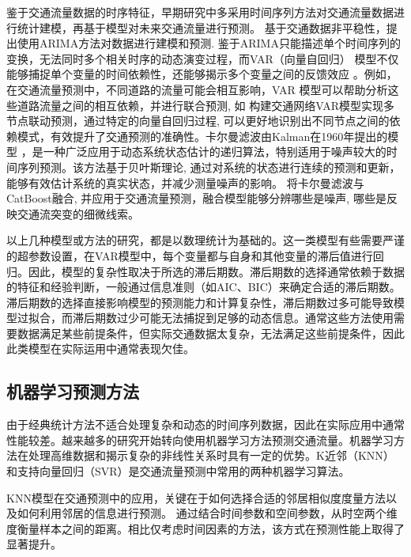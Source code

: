 鉴于交通流量数据的时序特征，早期研究中多采用时间序列方法对交通流量数据进行统计建模，再基于模型对未来交通流量进行预测。\textcite{2003_Williams_Modeling_and_forecasting_vehicular_traffic_flow_as_a_seasonal_ARIMA_process_Theoretical_basis_and_empirical_results} 基于交通数据非平稳性，提出使用ARIMA方法对数据进行建模和预测. 鉴于ARIMA只能描述单个时间序列的变换，无法同时多个相关时序的动态演变过程，而VAR（向量自回归） 模型不仅能够捕捉单个变量的时间依赖性，还能够揭示多个变量之间的反馈效应 \parencite{1980_Sims_Macroeconomics_and_Reality}。例如，在交通流量预测中，不同道路的流量可能会相互影响，VAR 模型可以帮助分析这些道路流量之间的相互依赖，并进行联合预测, 如\textcite{2022_孙天瑀_基于向量自回归的城市交通流量预测算法研究} 构建交通网络VAR模型实现多节点联动预测，通过特定的向量自回归过程, 可以更好地识别出不同节点之间的依赖模式，有效提升了交通预测的准确性。卡尔曼滤波由Kalman在1960年提出的模型 \parencite{1960_Kalman_A_New_Approach_to_Linear_Filtering_and_Prediction_Problems}，是一种广泛应用于动态系统状态估计的递归算法，特别适用于噪声较大的时间序列预测。该方法基于贝叶斯理论, 通过对系统的状态进行连续的预测和更新，能够有效估计系统的真实状态，并减少测量噪声的影响。\textcite{2021_张塽旖_噪声免疫CatBoost与卡尔曼滤波短期交通流预测研究} 将卡尔曼滤波与CatBoost融合, 并应用于交通流量预测，融合模型能够分辨哪些是噪声, 哪些是反映交通流突变的细微线索。

以上几种模型或方法的研究，都是以数理统计为基础的。这一类模型有些需要严谨的超参数设置，在VAR模型中，每个变量都与自身和其他变量的滞后值进行回归。因此，模型的复杂性取决于所选的滞后期数。滞后期数的选择通常依赖于数据的特征和经验判断，一般通过信息准则（如AIC、BIC）来确定合适的滞后期数。滞后期数的选择直接影响模型的预测能力和计算复杂性，滞后期数过多可能导致模型过拟合，而滞后期数过少可能无法捕捉到足够的动态信息。通常这些方法使用需要数据满足某些前提条件，但实际交通数据太复杂，无法满足这些前提条件，因此此类模型在实际运用中通常表现欠佳。


\subsection{机器学习预测方法}
由于经典统计方法不适合处理复杂和动态的时间序列数据，因此在实际应用中通常性能较差。越来越多的研究开始转向使用机器学习方法预测交通流量。机器学习方法在处理高维数据和揭示复杂的非线性关系时具有一定的优势。K近邻（KNN）和支持向量回归（SVR）是交通流量预测中常用的两种机器学习算法。

KNN模型在交通预测中的应用，关键在于如何选择合适的邻居相似度度量方法以及如何利用邻居的信息进行预测。\textcite{2012_于滨_K近邻短时交通流预测模型} 通过结合时间参数和空间参数，从时空两个维度衡量样本之间的距离。相比仅考虑时间因素的方法，该方式在预测性能上取得了显著提升。

